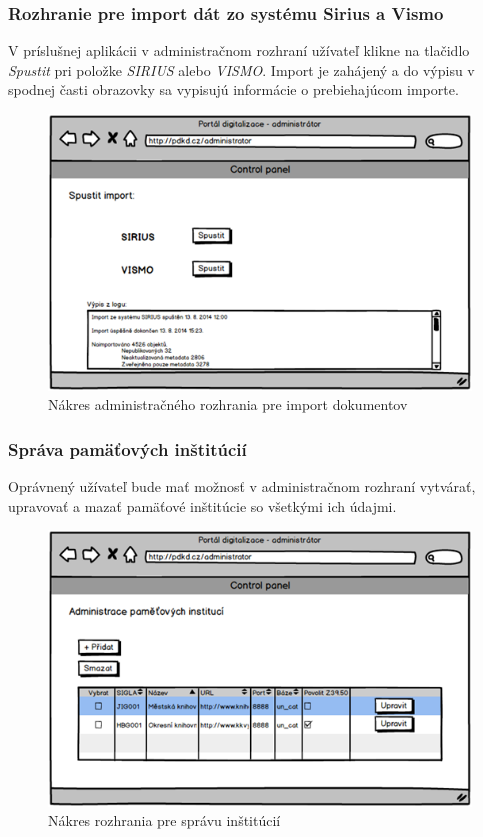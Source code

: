 \documentclass[
  print, %
  table,   %
  lof,     %
  nolot,     %
]{fithesis3}
\begin{document}
\subsubsection{Rozhranie pre import dát zo systému Sirius a Vismo}
V príslušnej aplikácii v administračnom rozhraní užívateľ klikne na tlačidlo \textit{Spustit} pri položke \textit{SIRIUS} alebo \textit{VISMO}. Import je zahájený a do výpisu v spodnej časti obrazovky sa vypisujú informácie o prebiehajúcom importe.
\begin{figure}[H]
	\centering
		\includegraphics[width=\textwidth]{fithesis/mockup/import.png}	
	\caption{Nákres administračného rozhrania pre import dokumentov}
	\label{mockup-import}
\end{figure}
\clearpage
\subsubsection{Správa pamäťových inštitúcií}
Oprávnený užívateľ bude mať možnosť v administračnom rozhraní vytvárať, upravovať a mazať pamäťové inštitúcie so všetkými ich údajmi.
\begin{figure}[H]
	\centering
		\includegraphics[width=\textwidth]{fithesis/mockup/institution.png}	
	\caption{Nákres rozhrania pre správu inštitúcií}
	\label{mockup-institution}
\end{figure}
\clearpage
\end{document}
